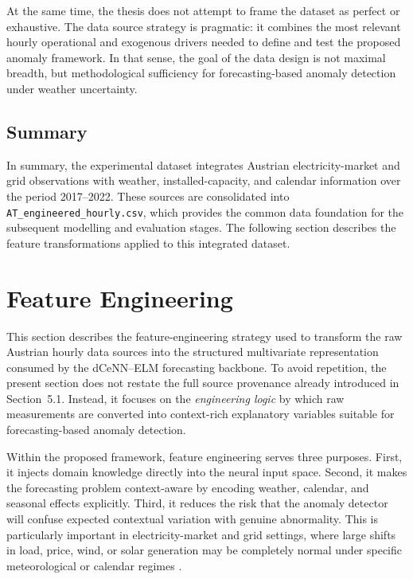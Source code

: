 At the same time, the thesis does not attempt to frame the dataset as perfect or exhaustive. The data source strategy is pragmatic: it combines the most relevant hourly operational and exogenous drivers needed to define and test the proposed anomaly framework. In that sense, the goal of the data design is not maximal breadth, but methodological sufficiency for forecasting-based anomaly detection under weather uncertainty.

\subsection{Summary}

In summary, the experimental dataset integrates Austrian electricity-market and grid observations with weather, installed-capacity, and calendar information over the period 2017--2022. These sources are consolidated into \texttt{AT\_engineered\_hourly.csv}, which provides the common data foundation for the subsequent modelling and evaluation stages. The following section describes the feature transformations applied to this integrated dataset.


\section{Feature Engineering}
\label{sec:feature_engineering}

This section describes the feature-engineering strategy used to transform the raw Austrian hourly data sources into the structured multivariate representation consumed by the dCeNN--ELM forecasting backbone. To avoid repetition, the present section does not restate the full source provenance already introduced in Section~5.1. Instead, it focuses on the \emph{engineering logic} by which raw measurements are converted into context-rich explanatory variables suitable for forecasting-based anomaly detection.

Within the proposed framework, feature engineering serves three purposes. First, it injects domain knowledge directly into the neural input space. Second, it makes the forecasting problem context-aware by encoding weather, calendar, and seasonal effects explicitly. Third, it reduces the risk that the anomaly detector will confuse expected contextual variation with genuine abnormality. This is particularly important in electricity-market and grid settings, where large shifts in load, price, wind, or solar generation may be completely normal under specific meteorological or calendar regimes \cite{repo_thesis_grid_anomaly}.

